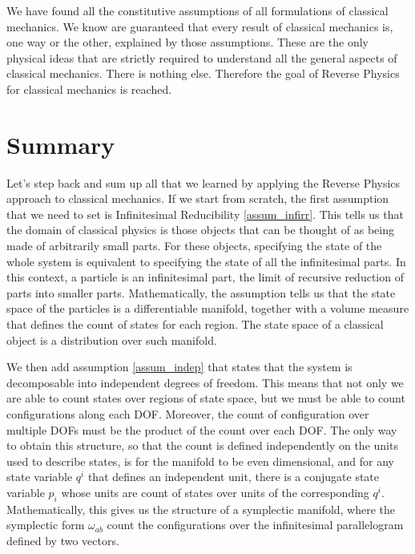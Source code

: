 We have found all the constitutive assumptions of all formulations of classical mechanics. We know are guaranteed that every result of classical mechanics is, one way or the other, explained by those assumptions. These are the only physical ideas that are strictly required to understand all the general aspects of classical mechanics. There is nothing else. Therefore the goal of Reverse Physics for classical mechanics is reached.

\section{Summary}

Let's step back and sum up all that we learned by applying the Reverse Physics approach to classical mechanics. If we start from scratch, the first assumption that we need to set is Infinitesimal Reducibility \ref{assum_infirr}. This tells us that the domain of classical physics is those objects that can be thought of as being made of arbitrarily small parts. For these objects, specifying the state of the whole system is equivalent to specifying the state of all the infinitesimal parts. In this context, a particle is an infinitesimal part, the limit of recursive reduction of parts into smaller parts. Mathematically, the assumption tells us that the state space of the particles is a differentiable manifold, together with a volume measure that defines the count of states for each region. The state space of a classical object is a distribution over such manifold.

We then add assumption \ref{assum_indep} that states that the system is decomposable into independent degrees of freedom. This means that not only we are able to count states over regions of state space, but we must be able to count configurations along each DOF. Moreover, the count of configuration over multiple DOFs must be the product of the count over each DOF. The only way to obtain this structure, so that the count is defined independently on the units used to describe states, is for the manifold to be even dimensional, and for any state variable $q^i$ that defines an independent unit, there is a conjugate state variable $p_i$ whose units are count of states over units of the corresponding $q^i$. Mathematically, this gives us the structure of a symplectic manifold, where the symplectic form $\omega_{ab}$ count the configurations over the infinitesimal parallelogram defined by two vectors.

